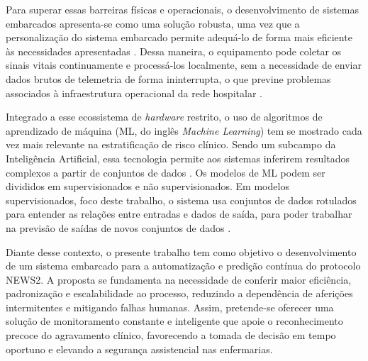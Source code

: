Para superar essas barreiras físicas e operacionais, o desenvolvimento de sistemas embarcados apresenta-se como uma solução robusta, uma vez que a personalização do sistema embarcado permite adequá-lo de forma mais eficiente às necessidades apresentadas \cite{embedesSystem}. Dessa maneira, o equipamento pode coletar os sinais vitais continuamente e processá-los localmente, sem a necessidade de enviar dados brutos de telemetria de forma ininterrupta, o que previne problemas associados à infraestrutura operacional da rede hospitalar \cite{rancea2024edge}.


Integrado a esse ecossistema de \textit{hardware} restrito, o uso de algoritmos de aprendizado de máquina (ML, do inglês \textit{Machine Learning}) tem se mostrado cada vez mais relevante na estratificação de risco clínico. Sendo um subcampo da Inteligência Artificial, essa tecnologia permite aos sistemas inferirem resultados complexos a partir de conjuntos de dados \cite{ibmMl}. Os modelos de ML podem ser divididos em supervisionados e não supervisionados. Em modelos supervisionados, foco deste trabalho, o sistema usa conjuntos de dados rotulados para entender as relações entre entradas e dados de saída, para poder trabalhar na previsão de saídas de novos conjuntos de dados \cite{ibmSupervised}.

Diante desse contexto, o presente trabalho tem como objetivo o desenvolvimento de um sistema embarcado para a automatização e predição contínua do protocolo NEWS2. A proposta se fundamenta na necessidade de conferir maior eficiência, padronização e escalabilidade ao processo, reduzindo a dependência de aferições intermitentes e mitigando falhas humanas. Assim, pretende-se oferecer uma solução de monitoramento constante e inteligente que apoie o reconhecimento precoce do agravamento clínico, favorecendo a tomada de decisão em tempo oportuno e elevando a segurança assistencial nas enfermarias.

